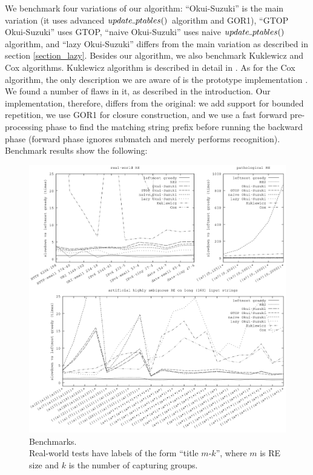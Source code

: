 \documentclass[AMA,STIX1COL]{WileyNJD-v2}
\newcommand{\Xund}{\rule{.4em}{.4pt}}
\begin{document}
We benchmark four variations of our algorithm:
``Okui-Suzuki'' is the main variation (it uses advanced $update \Xund ptables ()$ algorithm and GOR1),
``GTOP Okui-Suzuki'' uses GTOP,
``naive Okui-Suzuki'' uses naive $update \Xund ptables ()$ algorithm,
and ``lazy Okui-Suzuki'' differs from the main variation as described in section \ref{section_lazy}.
%
Besides our algorithm, we also benchmark Kuklewicz and Cox algorithms.
Kuklewicz algorithm is described in detail in \cite{Tro17}.
As for the Cox algorithm, the only description we are aware of is the prototype implementation \cite{Cox09}.
We found a number of flaws in it, as described in the introduction.
Our implementation, therefore, differs from the original:
we add support for bounded repetition,
we use GOR1 for closure construction,
and we use a fast forward pre-processing phase to find the matching string prefix before running the backward phase
(forward phase ignores submatch and merely performs recognition).
%
Benchmark results show the following:
\\[-0.5em]

\begin{figure}
\includegraphics[width=\linewidth]{img/bench/plot.png}
\vspace{-2em}
\caption{
Benchmarks.\\
Real-world tests have labels of the form ``title $m$-$k$'', where $m$ is RE size and $k$ is the number of capturing groups.
}\label{fig:bench}
\end{figure}
\end{document}
